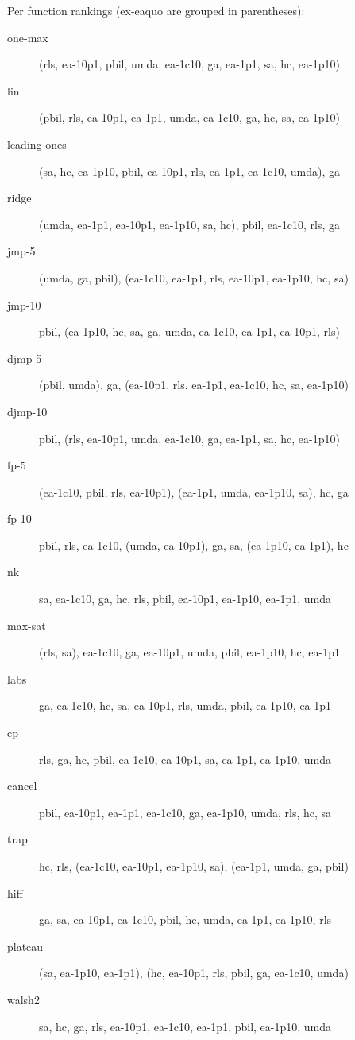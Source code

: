 Per function rankings (ex-eaquo are grouped in parentheses):
\begin{description}
\item[one-max]
(rls, ea-10p1, pbil, umda, ea-1c10, ga, ea-1p1, sa, hc, ea-1p10)

\item[lin]
(pbil, rls, ea-10p1, ea-1p1, umda, ea-1c10, ga, hc, sa, ea-1p10)

\item[leading-ones]
(sa, hc, ea-1p10, pbil, ea-10p1, rls, ea-1p1, ea-1c10, umda), ga

\item[ridge]
(umda, ea-1p1, ea-10p1, ea-1p10, sa, hc), pbil, ea-1c10, rls, ga

\item[jmp-5]
(umda, ga, pbil), (ea-1c10, ea-1p1, rls, ea-10p1, ea-1p10, hc, sa)

\item[jmp-10]
pbil, (ea-1p10, hc, sa, ga, umda, ea-1c10, ea-1p1, ea-10p1, rls)

\item[djmp-5]
(pbil, umda), ga, (ea-10p1, rls, ea-1p1, ea-1c10, hc, sa, ea-1p10)

\item[djmp-10]
pbil, (rls, ea-10p1, umda, ea-1c10, ga, ea-1p1, sa, hc, ea-1p10)

\item[fp-5]
(ea-1c10, pbil, rls, ea-10p1), (ea-1p1, umda, ea-1p10, sa), hc, ga

\item[fp-10]
pbil, rls, ea-1c10, (umda, ea-10p1), ga, sa, (ea-1p10, ea-1p1), hc

\item[nk]
sa, ea-1c10, ga, hc, rls, pbil, ea-10p1, ea-1p10, ea-1p1, umda

\item[max-sat]
(rls, sa), ea-1c10, ga, ea-10p1, umda, pbil, ea-1p10, hc, ea-1p1

\item[labs]
ga, ea-1c10, hc, sa, ea-10p1, rls, umda, pbil, ea-1p10, ea-1p1

\item[ep]
rls, ga, hc, pbil, ea-1c10, ea-10p1, sa, ea-1p1, ea-1p10, umda

\item[cancel]
pbil, ea-10p1, ea-1p1, ea-1c10, ga, ea-1p10, umda, rls, hc, sa

\item[trap]
hc, rls, (ea-1c10, ea-10p1, ea-1p10, sa), (ea-1p1, umda, ga, pbil)

\item[hiff]
ga, sa, ea-10p1, ea-1c10, pbil, hc, umda, ea-1p1, ea-1p10, rls

\item[plateau]
(sa, ea-1p10, ea-1p1), (hc, ea-10p1, rls, pbil, ga, ea-1c10, umda)

\item[walsh2]
sa, hc, ga, rls, ea-10p1, ea-1c10, ea-1p1, pbil, ea-1p10, umda

\end{description}
